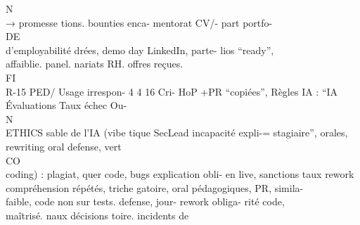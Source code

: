 \vspace{0.5em}
\vspace{0.5em}
\vspace{0.5em}
\vspace{0.5em}
N\\
→        promesse                         tions.              bounties   enca- mentorat     CV/- part     portfo-\\
\vspace{0.5em}
\vspace{0.5em}
\vspace{0.5em}
\vspace{0.5em}
DE\\
d’employabilité                                               drées, demo day LinkedIn, parte- lios “ready”,\\
affaiblie.                                                    panel.           nariats RH.        offres reçues.\\
\vspace{0.5em}
\vspace{0.5em}
\vspace{0.5em}
\vspace{0.5em}
FI\\
R-15       PED/     Usage irrespon- 4 4 16 Cri- HoP +PR          “copiées”, Règles IA : “IA Évaluations          Taux échec Ou-\\
\vspace{0.5em}
\vspace{0.5em}
\vspace{0.5em}
\vspace{0.5em}
N\\
ETHICS   sable de l’IA (vibe    tique SecLead incapacité expli-=        stagiaire”, orales, rewriting oral defense, vert\\
\vspace{0.5em}
\vspace{0.5em}
\vspace{0.5em}
\vspace{0.5em}
CO\\
coding) : plagiat,                   quer code, bugs explication obli- en live, sanctions taux rework\\
compréhension                        répétés, triche gatoire,         oral pédagogiques, PR,         simila-\\
faible, code non                     sur tests.         defense,     jour- rework obliga- rité         code,\\
maîtrisé.                                               naux décisions toire.                incidents de\\
